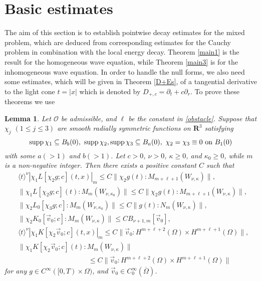 \documentclass[12pt]{amsart}
\newcommand{\R}{{\mathbf R}}
\newcommand{\norm}[2]{\|#1 \!:\! #2\|}
\DeclareMathOperator{\supp}{\rm supp}
\newtheorem{lemma}[theorem]{Lemma}
\numberwithin{equation}{section}
\begin{document}
\section{Basic estimates}

The aim of this section is to establish pointwise decay estimates
for the mixed problem,
which are deduced from corresponding estimates for the Cauchy problem
in combination with the local energy decay.
Theorem \ref{main1} is the result for the homogeneous wave equation, while Theorem \ref{main3} is for the inhomogeneous wave equation.
In order to handle the null forms, we also need some 
estimates, which will be given in Theorem \ref{D+Es}, of a tangential derivative to
the light cone $t=|x|$ which is denoted by $D_{+,c}=\partial_t+c\partial_r$.
To prove these theorems we use
\begin{lemma}\label{KataLem}
Let ${\mathcal O}$ be admissible, and
$\ell$ be the constant in \eqref{obstacle}.
Suppose that $\chi_j$ $(1\le j\le 3)$ are smooth radially symmetric functions
on $\R^3$
satisfying
$$
\supp \chi_1\subseteq B_b(0),\ \supp \chi_2, \supp \chi_3 \subseteq B_a(0),
\ \chi_2=\chi_3 \equiv 0 \text{ on $B_1(0)$}
$$
with some $a(>1)$ and $b(>1)$. 
Let $c>0$, $\nu>0$, $\kappa\ge 0$, and $\kappa_0\ge 0$, 
while $m$ is a non-negative integer.
Then there exists a positive constant $C$ such that
 \begin{align}
 & \langle t \rangle^\nu
   |\chi_1 L[ \chi_2 g;c ](t,x)|_m
\le C \norm{\chi_2 g(t)}{M_{m+\ell+1}(W_{\nu, \kappa})},\label{KataL01}\\
 & \norm{\chi_1L[\chi_2 g; c](t)}{M_m(W_{\nu, \kappa_0})}
      \le C \norm{\chi_2 g(t)}{M_{m+\ell+1}(W_{\nu, \kappa})},
   \label{KataL02}\\
 & \norm{\chi_2L_0[\chi_3 g; c]}{M_m(W_{\nu, \kappa_0})}
\le C\norm{g(t)}{N_m(W_{\nu,\kappa})},
   \label{KataL03} \\
 & \norm{\chi_2K_0[\vec{v}_0; c]}{M_m(W_{\nu, \kappa})}
  \le C B_{\nu+1, m}[\vec{v}_0],
   \label{KataL04} \\
 & \langle t \rangle^\nu |\chi_1K[\chi_2 \vec{v}_0; c](t,x)|_m
  \le C \norm{\vec{v}_0}{H^{m+\ell+2}(\Omega)\times H^{m+\ell+1}(\Omega)},
   \label{KataL05} \\
 & \norm{\chi_1K[\chi_2\vec{v}_0; c](t)}{M_m(W_{\nu, \kappa})}
   \label{KataL06}\\
 & \qquad\qquad\qquad\qquad\qquad   
 \le C \norm{\vec{v}_0}{H^{m+\ell+2}(\Omega) \times H^{m+\ell+1} (\Omega)}
\nonumber 
\end{align}
for any $g\in C^\infty([0,T)\times \Omega)$, and $\vec{v}_0\in  C^\infty_0(\overline{\Omega})$.
\end{lemma}
\end{document}
